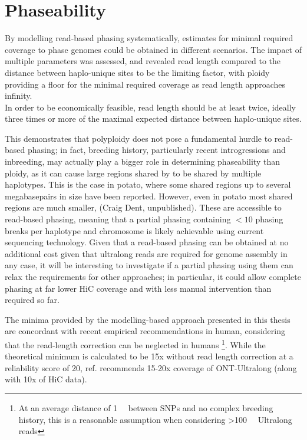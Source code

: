 
\section*{Phaseability}

By modelling read-based phasing systematically, estimates for minimal required coverage to phase genomes could be obtained in different scenarios.
The impact of multiple parameters was assessed, and revealed read length compared to the distance between haplo-unique sites to be the limiting factor, with ploidy providing a floor for the minimal required coverage as read length approaches infinity.\\
In order to be economically feasible, read length should be at least twice, ideally three times or more of the maximal expected distance between haplo-unique sites.

This demonstrates that polyploidy does not pose a fundamental hurdle to read-based phasing; in fact, breeding history, particularly recent introgressions and inbreeding, may actually play a bigger role in determining phaseability than ploidy, as it can cause large regions shared by to be shared by multiple haplotypes.
This is the case in potato, where some shared regions up to several megabasepairs in size have been reported.
However, even in potato most shared regions are much smaller, (Craig Dent, unpublished). %
These are accessible to read-based phasing, meaning that a partial phasing containing $<10$ phasing breaks per haplotype and chromosome is likely achievable using current sequencing technology.
Given that a read-based phasing can be obtained at no additional cost given that ultralong reads are required for genome assembly in any case, it will be interesting to investigate if a partial phasing using them can relax the requirements for other approaches; in particular, it could allow complete phasing at far lower HiC coverage and with less manual intervention than required so far\cite{xiao26}. %

The minima provided by the modelling-based approach presented in this thesis are concordant with recent empirical recommendations in human, considering that the read-length correction can be neglected in humans 
\footnote{At an average distance of \qty{1}{\kilo\bp} between SNPs and no complex breeding history, this is a reasonable assumption when considering >\qty{100}{\kilo\bp} Ultralong reads}.
While the theoretical minimum is calculated to be 15x without read length correction at a reliability score of 20, ref. \cite{sarashetti24} recommends 15-20x coverage of ONT-Ultralong (along with 10x of HiC data).\\


